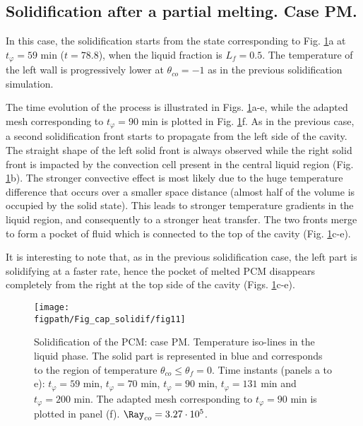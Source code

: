 \subsection{Solidification after a partial melting. Case PM.} \label{sec_solid_partial} 

In this case, the solidification starts from the state corresponding to Fig. \ref{fig:evolution_t80}a at $t_{\varphi} = 59$ min ($t=78.8$), when the liquid fraction is $L_f = 0.5$. 
The temperature of the left wall is progressively lower at $\theta_{co}=-1$ as in the previous solidification simulation.  

The time evolution of the process is illustrated in Figs. \ref{fig:evolution_t80}a-e, while the adapted mesh corresponding to $t_{\varphi} = 90$ min is plotted in Fig. \ref{fig:evolution_t80}f. 
As in the previous case, a second  solidification front starts to propagate from the left side of the cavity. \\
The straight shape of the left solid front is always observed while the right solid front is impacted by the convection cell present in the central liquid region (Fig. \ref{fig:evolution_t80}b). 
The stronger convective effect is most likely due to the huge temperature difference that occurs over a smaller space distance (almost half of the volume is occupied by the solid state). 
This leads to stronger temperature gradients in the liquid region, and consequently to a stronger heat transfer. 
The two fronts merge to form a pocket of fluid which is connected to the top of the cavity (Fig. \ref{fig:evolution_t80}c-e). 

It is interesting to  note that, as in the previous solidification case, the left part is solidifying at a faster rate, hence the pocket of melted PCM disappears completely from the right at the top side of the cavity (Figs. \ref{fig:evolution_t80}c-e).
\begin{figure}
	\begin{center}
		\texttt{[image: \\figpath/Fig\_cap\_solidif/fig11]}
	\end{center}
	\caption{Solidification of the PCM: case PM. Temperature iso-lines in the liquid phase. The solid part is represented in blue and corresponds to the region of temperature $\theta_{co} \leq \theta_f=0$. Time instants (panels  a to e): $t_{\varphi} = 59$ min, $t_{\varphi} = 70$ min, $t_{\varphi} = 90$ min, $t_{\varphi} = 131$ min and $t_{\varphi} = 200$ min. The adapted mesh corresponding to $t_{\varphi} = 90$ min is plotted in panel (f).  $ \Ray_{co}=3.27 \cdot 10^5$.}\label{fig:evolution_t80}
\end{figure}

